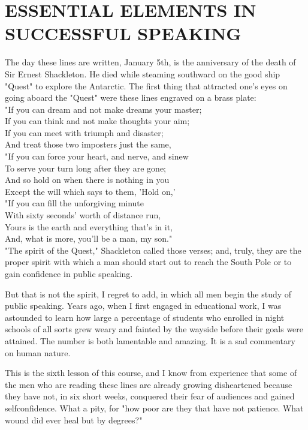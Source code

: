 \documentclass[10pt]{article}
\begin{document}
\section*{ESSENTIAL ELEMENTS IN SUCCESSFUL SPEAKING}
The day these lines are written, January 5th, is the anniversary of the death of Sir Ernest Shackleton. He died while steaming southward on the good ship "Quest" to explore the Antarctic. The first thing that attracted one's eyes on going aboard the "Quest" were these lines engraved on a brass plate:\\
"If you can dream and not make dreams your master;\\
If you can think and not make thoughts your aim;\\
If you can meet with triumph and disaster;\\
And treat those two imposters just the same,\\
"If you can force your heart, and nerve, and sinew\\
To serve your turn long after they are gone;\\
And so hold on when there is nothing in you\\
Except the will which says to them, 'Hold on,'\\
"If you can fill the unforgiving minute\\
With sixty seconds' worth of distance run,\\
Yours is the earth and everything that's in it,\\
And, what is more, you'll be a man, my son."\\
"The spirit of the Quest," Shackleton called those verses; and, truly, they are the proper spirit with which a man should start out to reach the South Pole or to gain confidence in public speaking.

But that is not the spirit, I regret to add, in which all men begin the study of public speaking. Years ago, when I first engaged in educational work, I was astounded to learn how large a percentage of students who enrolled in night schools of all sorts grew weary and fainted by the wayside before their goals were attained. The number is both lamentable and amazing. It is a sad commentary on human nature.

This is the sixth lesson of this course, and I know from experience that some of the men who are reading these lines are already growing disheartened because they have not, in six short weeks, conquered their fear of audiences and gained selfconfidence. What a pity, for "how poor are they that have not patience. What wound did ever heal but by degrees?"
\end{document}

